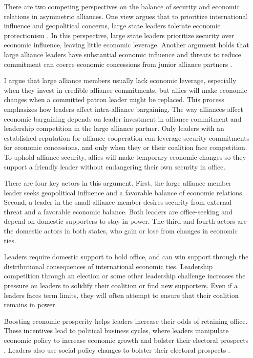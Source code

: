 \documentclass[12pt]{article}
\begin{document}
There are two competing perspectives on the balance of security and economic relations in asymmetric alliances.
One view argues that to prioritize international influence and geopolitical concerns, large state leaders tolerate economic protectionism \citep{Drezner2013, WolfordKim2017}. 
In this perspective, large state leaders prioritize security over economic influence, leaving little economic leverage. 
Another argument holds that large alliance leaders have substantial economic influence \citep{Norrlof2010, Brooksetal2013} and threats to reduce commitment can coerce economic concessions from junior alliance partners \citep{Oatley2015}.  


I argue that large alliance members usually lack economic leverage, especially when they invest in credible alliance commitments, but allies will make economic changes when a committed patron leader might be replaced. 
This process emphasizes how leaders affect intra-alliance bargaining. 
The way alliances affect economic bargaining depends on leader investment in alliance commitment and leadership competition in the large alliance partner.  
Only leaders with an established reputation for alliance cooperation can leverage security commitments for economic concessions, and only when they or their coalition face competition. 
To uphold alliance security, allies will make temporary economic changes so they support a friendly leader without endangering their own security in office. 


There are four key actors in this argument. 
First, the large alliance member leader seeks geopolitical influence and a favorable balance of economic relations. 
Second, a leader in the small alliance member desires security from external threat and a favorable economic balance.
Both leaders are office-seeking and depend on domestic supporters to stay in power.
The third and fourth actors are the domestic actors in both states, who gain or lose from changes in economic ties. 


Leaders require domestic support to hold office, and can win support through the distributional consequences of international economic ties. 
Leadership competition through an election or some other leadership challenge increases the pressure on leaders to solidify their coalition or find new supporters. 
Even if a leaders faces term limits, they will often attempt to ensure that their coalition remains in power.  


Boosting economic prosperity helps leaders increase their odds of retaining office. 
These incentives lead to political business cycles, where leaders manipulate economic policy to increase economic growth and bolster their electoral prospects \citep{Rogoff1987, ClarkHallerberg2000}.
Leaders also use social policy changes to bolster their electoral prospects \citep{Ahlquist2010, Philips2020}. 
\end{document}
